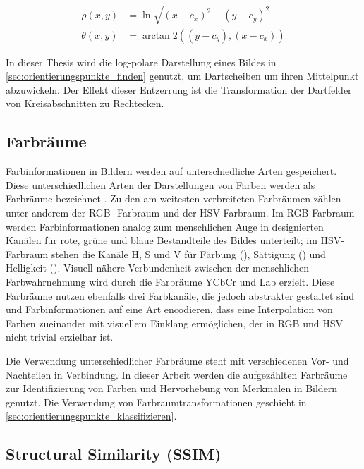\begin{align*}
    \rho(x, y)   & = \ln \sqrt{(x - c_x)^ 2 + (y - c_y)^2}      \\
    \theta(x, y) & = \arctan2 \left((y - c_y), (x - c_x)\right)
\end{align*}

In dieser Thesis wird die log-polare Darstellung eines Bildes in \autoref{sec:orientierungspunkte_finden} genutzt, um Dartscheiben um ihren Mittelpunkt abzuwickeln. Der Effekt dieser Entzerrung ist die Transformation der Dartfelder von Kreisabschnitten zu Rechtecken.


\subsection{Farbräume}
\label{sec:farbräume}

Farbinformationen in Bildern werden auf unterschiedliche Arten gespeichert. Diese unterschiedlichen Arten der Darstellungen von Farben werden als Farbräume bezeichnet \cite{color_space,cv_general}. Zu den am weitesten verbreiteten Farbräumen zählen unter anderem der RGB- Farbraum und der HSV-Farbraum. Im RGB-Farbraum werden Farbinformationen analog zum menschlichen Auge in designierten Kanälen für rote, grüne und blaue Bestandteile des Bildes unterteilt; im HSV-Farbraum stehen die Kanäle H, S und V für Färbung (), Sättigung () und Helligkeit (). Visuell nähere Verbundenheit zwischen der menschlichen Farbwahrnehmung wird durch die Farbräume YCbCr und Lab erzielt. Diese Farbräume nutzen ebenfalls drei Farbkanäle, die jedoch abstrakter gestaltet sind und Farbinformationen auf eine Art encodieren, dass eine Interpolation von Farben zueinander mit visuellem Einklang ermöglichen, der in RGB und HSV nicht trivial erzielbar ist.

Die Verwendung unterschiedlicher Farbräume steht mit verschiedenen Vor- und Nachteilen in Verbindung. In dieser Arbeit werden die aufgezählten Farbräume zur Identifizierung von Farben und Hervorhebung von Merkmalen in Bildern genutzt. Die Verwendung von Farbraumtransformationen geschieht in \autoref{sec:orientierungspunkte_klassifizieren}.


\subsection{Structural Similarity (SSIM)}
\label{sec:ssim}

